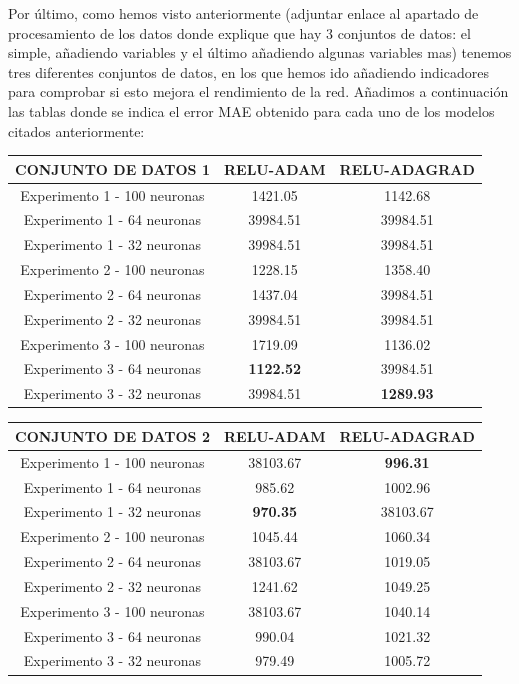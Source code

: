 \documentclass[11pt]{article} %
\begin{document}
\vspace{2ex}

Por último, como hemos visto anteriormente (adjuntar enlace al apartado de procesamiento de los datos donde explique que hay 3 conjuntos de datos: el simple, añadiendo variables y el último añadiendo algunas variables mas) tenemos tres diferentes conjuntos de datos, en los que hemos ido añadiendo indicadores para comprobar si esto mejora el rendimiento de la red. Añadimos a continuación las tablas donde se indica el error MAE obtenido para cada uno de los modelos citados anteriormente:


\vspace{5ex} 

\begin{tabular}{| c | c | c | }
	\hline
	CONJUNTO DE DATOS 1 & RELU-ADAM & RELU-ADAGRAD \\ \hline 
	Experimento 1 - 100 neuronas & 1421.05 & 1142.68 \\ \hline 
	Experimento 1 - 64 neuronas & 39984.51 & 39984.51 \\ \hline 
	Experimento 1 - 32 neuronas & 39984.51 & 39984.51 \\ \hline
	Experimento 2 - 100 neuronas & 1228.15 & 1358.40 \\ \hline 	
	Experimento 2 - 64 neuronas & 1437.04 & 39984.51 \\ \hline 
	Experimento 2 - 32 neuronas & 39984.51 & 39984.51 \\ \hline 
	Experimento 3 - 100 neuronas & 1719.09 & 1136.02 \\ \hline
	Experimento 3 - 64 neuronas & \textbf{1122.52} & 39984.51 \\ \hline 	
	Experimento 3 - 32 neuronas & 39984.51 & \textbf{1289.93} \\ \hline 
\end{tabular}

\vspace{5ex}

\begin{tabular}{| c | c | c | }
	\hline
	CONJUNTO DE DATOS 2 & RELU-ADAM & RELU-ADAGRAD \\ \hline 
	Experimento 1 - 100 neuronas & 38103.67 & \textbf{996.31} \\ \hline 
	Experimento 1 - 64 neuronas & 985.62 & 1002.96 \\ \hline 
	Experimento 1 - 32 neuronas & \textbf{970.35} & 38103.67 \\ \hline
	Experimento 2 - 100 neuronas & 1045.44 & 1060.34 \\ \hline 	
	Experimento 2 - 64 neuronas & 38103.67 & 1019.05 \\ \hline 
	Experimento 2 - 32 neuronas & 1241.62 & 1049.25 \\ \hline 
	Experimento 3 - 100 neuronas & 38103.67 & 1040.14 \\ \hline
	Experimento 3 - 64 neuronas & 990.04 & 1021.32 \\ \hline 	
	Experimento 3 - 32 neuronas & 979.49 & 1005.72 \\ \hline 
\end{tabular}
\end{document}
